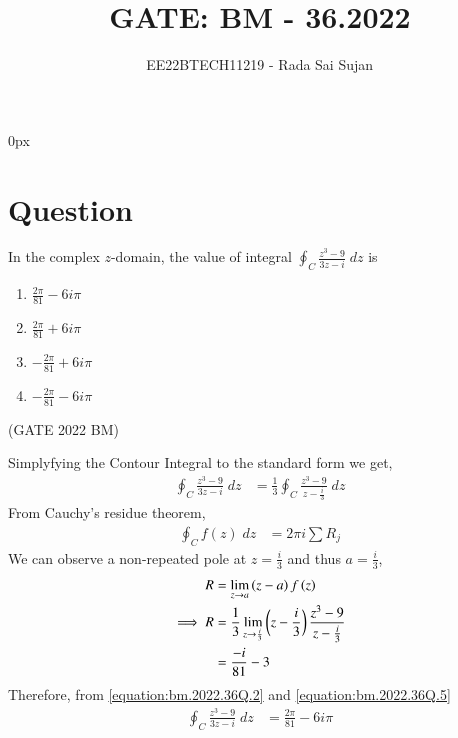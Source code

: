 \documentclass[journal,12pt,twocolumn]{IEEEtran}
\theoremstyle{remark}
\begin{document}
\parindent 0px

\title{GATE: BM - 36.2022}
\author{EE22BTECH11219 - Rada Sai Sujan$^{}$%
}
\maketitle
\newpage
\bigskip
\section*{Question}
In the complex $z$-domain, the value of integral $\oint_{C}\frac{z^3-9}{3z-i}\;dz$ is   \\
\begin{enumerate}[label=(\alph*)]
    \item $\frac{2\pi}{81}-6i\pi$ 
    \item $\frac{2\pi}{81}+6i\pi$ 
    \item $-\frac{2\pi}{81}+6i\pi$ 
    \item $-\frac{2\pi}{81}-6i\pi$ 
\end{enumerate} \hfill(GATE 2022 BM)    \\
\solution
\fi

Simplyfying the Contour Integral to the standard form we get,
\begin{align}
    \oint_{C}\frac{z^3-9}{3z-i}\;dz &= \frac{1}{3}\oint_{C}\frac{z^3-9}{z-\frac{i}{3}}\;dz
\end{align}
From Cauchy's residue theorem,
\begin{align}
    \oint_{C}f(z)\;dz &= 2\pi i\sum R_j \label{equation:bm.2022.36Q.2}
\end{align}
We can observe a non-repeated pole at $z=\frac{i}{3}$ and thus $a=\frac{i}{3}$,
\begin{align}
    R &= \lim\limits_{z\to a}\left(z-a\right)f\left(z\right)    \\
    \implies R &= \frac{1}{3}\lim\limits_{z\to \frac{i}{3}}\left(z-\frac{i}{3}\right)\frac{z^3-9}{z-\frac{i}{3}}  \\
    &= \frac{-i}{81}-3  \label{equation:bm.2022.36Q.5}
\end{align}
Therefore, from \eqref{equation:bm.2022.36Q.2} and \eqref{equation:bm.2022.36Q.5}
\begin{align}
    \oint_{C}\frac{z^3-9}{3z-i}\;dz &= \frac{2\pi}{81}-6i\pi
\end{align}
\end{document}

